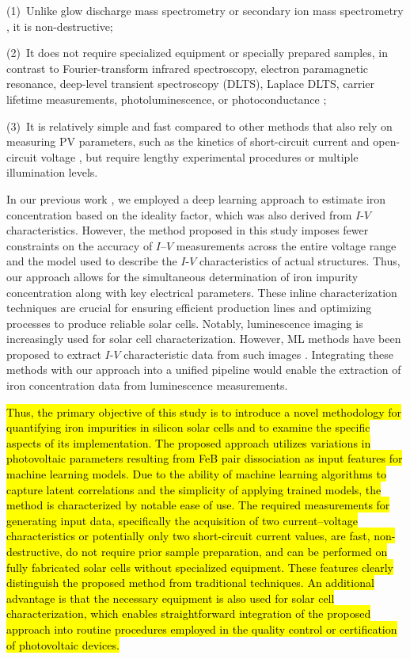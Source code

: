 \documentclass[a4paper,fleqn,draft]{cas-sc}
\begin{document}
\noindent
(1)~Unlike glow discharge mass spectrometry or secondary ion mass spectrometry \cite{DiSabatino2014}, it is non-destructive;

\noindent
(2)~It does not require specialized equipment or specially prepared samples, in contrast
to Fourier-transform infrared spectroscopy, electron paramagnetic resonance, deep-level transient spectroscopy (DLTS),
Laplace DLTS, carrier lifetime measurements, photoluminescence, or photoconductance
\cite{Schroder2006, HowMuchPhysics, LaplDLTS, Rein2, Schmidt2005, FeMethod2012, Goodarzi2017};

\noindent
(3)~It is relatively simple and fast compared to other methods that also rely on measuring PV parameters,
such as the kinetics of short-circuit current \cite{Olikh2021JAP} and open-circuit voltage \cite{Herguth2022},
but require lengthy experimental procedures or multiple illumination levels.

In our previous work \cite{Olikh2022PPV},
we employed a deep learning approach to estimate iron concentration based on the ideality factor,
which was also derived from $I$-$V$ characteristics.
However, the method proposed in this study imposes fewer constraints on the accuracy of $I$–$V$ measurements across the entire voltage range
and the model used to describe the $I$-$V$ characteristics of actual structures.
Thus, our approach allows for the simultaneous determination of iron impurity concentration along with key electrical parameters.
These inline characterization techniques are crucial for ensuring efficient production lines and optimizing processes to produce reliable solar cells.
Notably, luminescence imaging is increasingly used for solar cell characterization.
However, ML methods have been proposed to extract $I$-$V$ characteristic data from such images \cite{Kunze2023, Battaglia2023}.
Integrating these methods with our approach into a unified pipeline would enable the extraction of iron concentration data from luminescence measurements.

\textcolor[rgb]{1.00,0.07,0.00}{
\hl{
Thus, the primary objective of this study is to introduce a novel methodology for quantifying iron impurities
in silicon solar cells and to examine the specific aspects of its implementation.
The proposed approach utilizes variations in photovoltaic parameters resulting
from FeB pair dissociation as input features for machine learning models.
Due to the ability of machine learning algorithms to capture latent correlations and the simplicity of applying trained models,
the method is characterized by notable ease of use.
The required measurements for generating input data,
specifically the acquisition of two current–voltage characteristics or potentially
only two short-circuit current values, are fast, non-destructive, do not require prior sample preparation,
and can be performed on fully fabricated solar cells without specialized equipment.
These features clearly distinguish the proposed method from traditional techniques.
An additional advantage is that the necessary equipment is also used for solar cell characterization,
which enables straightforward integration of the proposed approach into routine procedures
employed in the quality control or certification of photovoltaic devices.
}}
\end{document}
